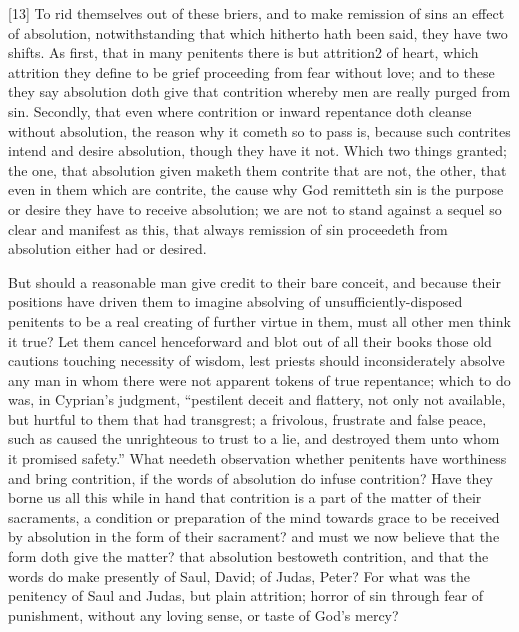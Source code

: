 [13] To rid themselves out of these briers, and to make remission of sins an effect of absolution, notwithstanding that which hitherto hath been said, they have two shifts. As first, that in many penitents there is but attrition2 of heart, which attrition they define to be grief proceeding from fear without love; and to these they say absolution doth give that contrition  whereby men are really purged from sin. Secondly, that even where contrition or inward repentance doth cleanse without absolution, the reason why it cometh so to pass is, because such contrites intend and desire absolution, though they have it not. Which two things granted; the one, that absolution given maketh them contrite that are not, the other, that even in them which are contrite, the cause why God remitteth sin is the purpose or desire they have to receive absolution; we are not to stand against a sequel so clear and manifest as this, that always remission of sin proceedeth from absolution either had or desired.

But should a reasonable man give credit to their bare conceit, and because their positions have driven them to imagine absolving of unsufficiently-disposed penitents to be a real creating of further virtue in them, must all other men think it true? Let them cancel henceforward and blot out of all their books those old cautions touching necessity of wisdom, lest priests should inconsiderately absolve any man in whom there were not apparent tokens of true repentance; which to do was, in Cyprian’s judgment, “pestilent deceit and flattery, not only not available, but hurtful to them that had transgrest; a frivolous, frustrate and false peace, such as caused the unrighteous to trust to a lie, and destroyed them unto whom it promised safety.” What needeth observation whether penitents have worthiness and bring contrition, if the words of absolution do infuse contrition? Have they borne us all this while in hand that contrition is a part of the  matter of their sacraments, a condition or preparation of the mind towards grace to be received by absolution in the form of their sacrament? and must we now believe that the form doth give the matter? that absolution bestoweth contrition, and that the words do make presently of Saul, David; of Judas, Peter? For what was the penitency of Saul and Judas, but plain attrition; horror of sin through fear of punishment, without any loving sense, or taste of God’s mercy?

